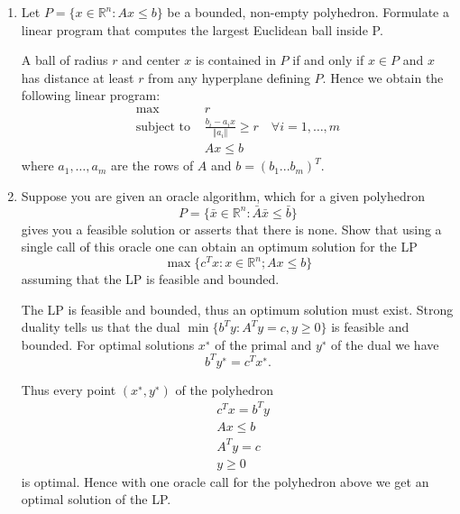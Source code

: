 \documentclass[11pt]{article}
\institute{\'Ecole Polytechnique F\'ed\'erale de Lausanne}
\newcommand{\setR}{\mathbb{R}}
\renewcommand{\leq}{\leqslant}
\begin{document}
\makeheader

\begin{enumerate}[1)]

\item Let $P= \{x ∈\setR^n : Ax ≤b\}$ be a bounded, non-empty polyhedron. Formulate a linear program that
computes the largest Euclidean ball inside P.

\begin{solution}
A ball of radius $r$ and center $x$ is contained in $P$ if and only if $x ∈P$ and $x$ has distance at least $r$
from any hyperplane defining $P$. Hence we obtain the following linear program:
\begin{align*}
\max \quad &r \\
\text{subject to }& \frac{b_i−a_i x}{\Vert a_i \Vert} ≥r \quad \forall i = 1, \hdots, m \\
& Ax ≤b
\end{align*}
where $a_1, \hdots , a_m$ are the rows of $A$ and $b = (b_1 . . . b_m)^T$.
\end{solution}

\item Suppose you are given an oracle algorithm, which for a given polyhedron
$$P= \{\bar{x}∈\setR^n: \bar{A}\bar{x} \leq \bar{b}\}$$
gives you a feasible solution or asserts that there is none. Show that using a single call of this oracle
one can obtain an optimum solution for the LP
$$\max\{c^T x : x∈\setR^n; Ax≤b\}$$
assuming that the LP is feasible and bounded.

\begin{solution}
The LP is feasible and bounded, thus an optimum solution must exist. Strong duality tells us that
the dual $\min\{b^T y: A^T y= c, y≥0\}$ is feasible and bounded. For optimal solutions $x^∗$ of the primal
and $y^∗$ of the dual we have $$b^T y^∗= c^T x^∗.$$

Thus every point $(x^∗,y^∗)$ of the polyhedron
\begin{align*}
&c^T x = b^T y \\
& Ax ≤ b \\
&A^T y= c \\
& y ≥ 0
\end{align*}
is optimal. Hence with one oracle call for the polyhedron above we get an optimal solution of the
LP.
\end{solution}




\end{enumerate}
\end{document}
